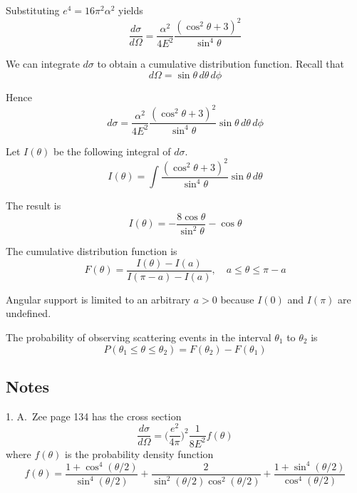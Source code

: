 \documentclass[12pt]{article}
\begin{document}
Substituting $e^4=16\pi^2\alpha^2$ yields
\begin{equation*}
\frac{d\sigma}{d\Omega}=\frac{\alpha^2}{4E^2}
\frac{(\cos^2\theta+3)^2}{\sin^4\theta}
\end{equation*}

We can integrate $d\sigma$ to obtain a cumulative distribution function.
Recall that
\begin{equation*}
d\Omega=\sin\theta\,d\theta\,d\phi
\end{equation*}

Hence
\begin{equation*}
d\sigma=\frac{\alpha^2}{4E^2}
\frac{\left(\cos^2\theta+3\right)^2}{\sin^4\theta}\sin\theta\,d\theta\,d\phi
\end{equation*}

Let $I(\theta)$ be the following integral of $d\sigma$.
\begin{equation*}
I(\theta)=\int\frac{\left(\cos^2\theta+3\right)^2}{\sin^4\theta}\sin\theta\,d\theta
\end{equation*}

The result is
\begin{equation*}
I(\theta)=-\frac{8\cos\theta}{\sin^2\theta}-\cos\theta
\end{equation*}

The cumulative distribution function is
\begin{equation*}
F(\theta)=\frac{I(\theta)-I(a)}{I(\pi-a)-I(a)},
\quad
a\le\theta\le\pi-a
\end{equation*}

Angular support is limited to an arbitrary $a>0$ because $I(0)$ and $I(\pi)$ are undefined.

\bigskip
The probability of observing scattering events in the interval $\theta_1$ to $\theta_2$ is
\begin{equation*}
P(\theta_1\le\theta\le\theta_2)=F(\theta_2)-F(\theta_1)
\end{equation*}

\subsection*{Notes}
1. A.~Zee page 134 has the cross section
\begin{equation*}
\frac{d\sigma}{d\Omega}=\bigg(\frac{e^2}{4\pi}\bigg)^2\frac{1}{8E^2}f(\theta)
\end{equation*}
where $f(\theta)$ is the probability density function
\begin{equation*}
f(\theta)=
\frac{1+\cos^4(\theta/2)}{\sin^4(\theta/2)}
+\frac{2}{\sin^2(\theta/2)\cos^2(\theta/2)}
+\frac{1+\sin^4(\theta/2)}{\cos^4(\theta/2)}
\end{equation*}
\end{document}
